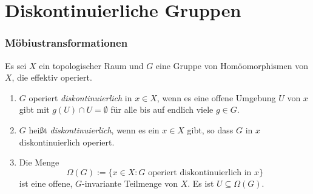 \part{Diskontinuierliche Gruppen}


\section{Möbiustransformationen}\label{sec_moebius}

\DB Es sei $X$ ein topologischer Raum und $G$ eine Gruppe von
Homöomorphismen von $X$, die effektiv operiert.
\begin{enumerate}
\item $G$ operiert \emph{diskontinuierlich}
in $x\in X$, wenn es
eine offene Umgebung $U$ von $x$ gibt mit $g(U)\cap U=\emptyset$
für alle bis auf endlich viele $g\in G$.
\item $G$ heißt \emph{diskontinuierlich},
wenn es ein $x\in X$ gibt, so dass $G$ in $x$ diskontinuierlich
operiert.
\item Die Menge
\[
\Omega(G) := \{x\in X : G \text{ operiert diskontinuierlich in } x \}
\]
ist eine offene, $G$-invariante Teilmenge von $X$.
Es ist $U\subseteq \Omega(G)$.
\end{enumerate}

